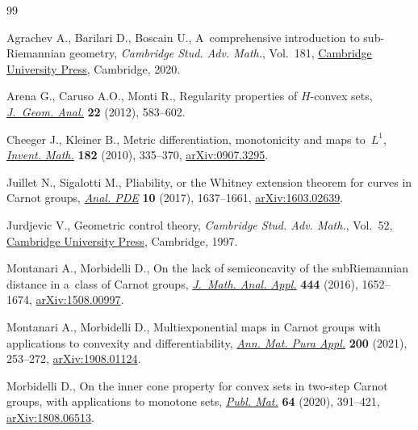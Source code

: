 \documentclass[pdftex]{sigma}
\numberwithin{equation}{section}
\theoremstyle{definition}
\begin{document}
\begin{thebibliography}{99}
\footnotesize\itemsep=0pt

Agrachev A., Barilari D., Boscain U., A~comprehensive introduction to
 sub-{R}iemannian geometry, \textit{Cambridge Stud. Adv. Math.}, Vol.~181,
 \href{https://doi.org/10.1017/9781108677325}{Cambridge University Press},
 Cambridge, 2020.

Arena G., Caruso A.O., Monti R., Regularity properties of {$H$}-convex sets,
 \href{https://doi.org/10.1007/s12220-010-9203-7}{\textit{J.~Geom. Anal.}}
 \textbf{22} (2012), 583--602.

Cheeger J., Kleiner B., Metric differentiation, monotonicity and maps
 to~{$L^1$}, \href{https://doi.org/10.1007/s00222-010-0264-9}{\textit{Invent.
 Math.}} \textbf{182} (2010), 335--370,
 \href{http://arxiv.org/abs/0907.3295}{arXiv:0907.3295}.

Juillet N., Sigalotti M., Pliability, or the {W}hitney extension theorem for
 curves in {C}arnot groups,
 \href{https://doi.org/10.2140/apde.2017.10.1637}{\textit{Anal. {PDE}}}
 \textbf{10} (2017), 1637--1661,
 \href{http://arxiv.org/abs/1603.02639}{arXiv:1603.02639}.

Jurdjevic V., Geometric control theory, \textit{Cambridge Stud. Adv. Math.},
 Vol.~52, \href{https://doi.org/10.1017/CBO9780511530036}{Cambridge University
 Press}, Cambridge, 1997.

Montanari A., Morbidelli D., On the lack of semiconcavity of the
 sub{R}iemannian distance in a~class of {C}arnot groups,
 \href{https://doi.org/10.1016/j.jmaa.2016.07.032}{\textit{J.~Math. Anal.
 Appl.}} \textbf{444} (2016), 1652--1674,
 \href{http://arxiv.org/abs/1508.00997}{arXiv:1508.00997}.

Montanari A., Morbidelli D., Multiexponential maps in {C}arnot groups with
 applications to convexity and differentiability,
 \href{https://doi.org/10.1007/s10231-020-00994-3}{\textit{Ann. Mat. Pura
 Appl.}} \textbf{200} (2021), 253--272,
 \href{http://arxiv.org/abs/1908.01124}{arXiv:1908.01124}.

Morbidelli D., On the inner cone property for convex sets in two-step {C}arnot
 groups, with applications to monotone sets,
 \href{https://doi.org/10.5565/PUBLMAT6422002}{\textit{Publ. Mat.}}
 \textbf{64} (2020), 391--421,
 \href{http://arxiv.org/abs/1808.06513}{arXiv:1808.06513}.


\end{thebibliography}
\end{document}
